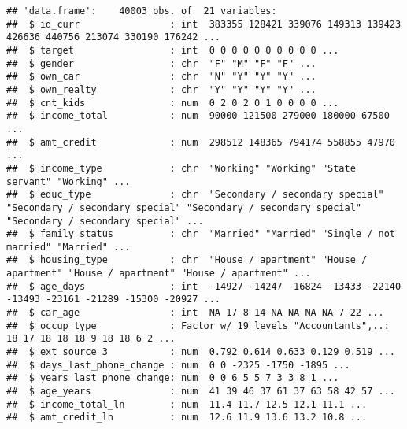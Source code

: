 \documentclass[
]{article}
\begin{document}
\begin{verbatim}
## 'data.frame':    40003 obs. of  21 variables:
##  $ id_curr                : int  383355 128421 339076 149313 139423 426636 440756 213074 330190 176242 ...
##  $ target                 : int  0 0 0 0 0 0 0 0 0 0 ...
##  $ gender                 : chr  "F" "M" "F" "F" ...
##  $ own_car                : chr  "N" "Y" "Y" "Y" ...
##  $ own_realty             : chr  "Y" "Y" "Y" "Y" ...
##  $ cnt_kids               : num  0 2 0 2 0 1 0 0 0 0 ...
##  $ income_total           : num  90000 121500 279000 180000 67500 ...
##  $ amt_credit             : num  298512 148365 794174 558855 47970 ...
##  $ income_type            : chr  "Working" "Working" "State servant" "Working" ...
##  $ educ_type              : chr  "Secondary / secondary special" "Secondary / secondary special" "Secondary / secondary special" "Secondary / secondary special" ...
##  $ family_status          : chr  "Married" "Married" "Single / not married" "Married" ...
##  $ housing_type           : chr  "House / apartment" "House / apartment" "House / apartment" "House / apartment" ...
##  $ age_days               : int  -14927 -14247 -16824 -13433 -22140 -13493 -23161 -21289 -15300 -20927 ...
##  $ car_age                : int  NA 17 8 14 NA NA NA NA 7 22 ...
##  $ occup_type             : Factor w/ 19 levels "Accountants",..: 18 17 18 18 18 9 18 18 6 2 ...
##  $ ext_source_3           : num  0.792 0.614 0.633 0.129 0.519 ...
##  $ days_last_phone_change : num  0 0 -2325 -1750 -1895 ...
##  $ years_last_phone_change: num  0 0 6 5 5 7 3 3 8 1 ...
##  $ age_years              : num  41 39 46 37 61 37 63 58 42 57 ...
##  $ income_total_ln        : num  11.4 11.7 12.5 12.1 11.1 ...
##  $ amt_credit_ln          : num  12.6 11.9 13.6 13.2 10.8 ...
\end{verbatim}
\end{document}
